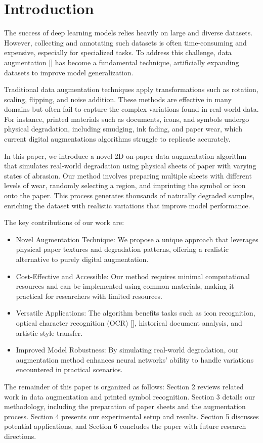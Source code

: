 \section{Introduction}\label{sec:introduction}

The success of deep learning models relies heavily on large and diverse datasets. However, collecting and annotating such datasets is often time-consuming and expensive, especially for specialized tasks. To address this challenge, data augmentation [] has become a fundamental technique, artificially expanding datasets to improve model generalization.

Traditional data augmentation techniques apply transformations such as rotation, scaling, flipping, and noise addition. These methods are effective in many domains but often fail to capture the complex variations found in real-world data. For instance, printed materials such as documents, icons, and symbols undergo physical degradation, including smudging, ink fading, and paper wear, which current digital augmentations algorithms struggle to replicate accurately.

In this paper, we introduce a novel 2D on-paper data augmentation algorithm that simulates real-world degradation using physical sheets of paper with varying states of abrasion. Our method involves preparing multiple sheets with different levels of wear, randomly selecting a region, and imprinting the symbol or icon onto the paper. This process generates thousands of naturally degraded samples, enriching the dataset with realistic variations that improve model performance.

The key contributions of our work are:

\begin{itemize}
    \item Novel Augmentation Technique: We propose a unique approach that leverages physical paper textures and degradation patterns, offering a realistic alternative to purely digital augmentation.
    \item Cost-Effective and Accessible: Our method requires minimal computational resources and can be implemented using common materials, making it practical for researchers with limited resources.
    \item Versatile Applications: The algorithm benefits tasks such as icon recognition, optical character recognition (OCR) [], historical document analysis, and artistic style transfer.
    \item Improved Model Robustness: By simulating real-world degradation, our augmentation method enhances neural networks' ability to handle variations encountered in practical scenarios.
\end{itemize}

The remainder of this paper is organized as follows: Section 2 reviews related work in data augmentation and printed symbol recognition. Section 3 details our methodology, including the preparation of paper sheets and the augmentation process. Section 4 presents our experimental setup and results. Section 5 discusses potential applications, and Section 6 concludes the paper with future research directions.